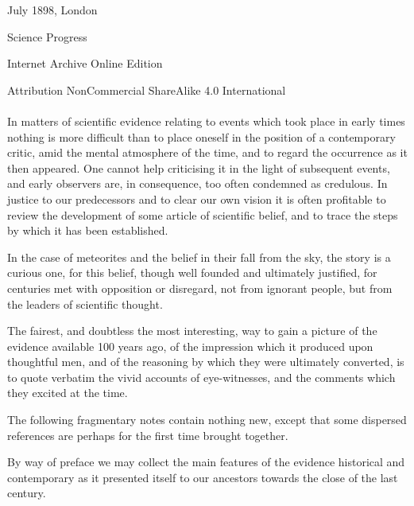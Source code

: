 \documentclass[a4paper, 12pt, oneside]{article}
\begin{document}
\begin{titlepage}
	\vspace*{\fill}%
	
	{\small July 1898, London}%
	
	{\small Science Progress} %

	\vspace{1\baselineskip} %

    Internet Archive Online Edition  %
	
	{\small Attribution NonCommercial ShareAlike 4.0 International } %
\end{titlepage}
\clearpage
\paragraph{}
In matters of scientific evidence relating to events which took place in early times nothing is more difficult than to place oneself in the position of a contemporary critic, amid the mental atmosphere of the time, and to regard the occurrence as it then appeared. One cannot help criticising it in the light of subsequent events, and early observers are, in consequence, too often condemned as credulous. In justice to our predecessors and to clear our own vision it is often profitable to review the development of some article of scientific belief, and to trace the steps by which it has been established. 

In the case of meteorites and the belief in their fall from the sky, the story is a curious one, for this belief, though well founded and ultimately justified, for centuries met with opposition or disregard, not from ignorant people, but from the leaders of scientific thought. 

The fairest, and doubtless the most interesting, way to gain a picture of the evidence available 100 years ago, of the impression which it produced upon thoughtful men, and of the reasoning by which they were ultimately converted, is to quote verbatim the vivid accounts of eye-witnesses, and the comments which they excited at the time. 

The following fragmentary notes contain nothing new, except that some dispersed references are perhaps for the first time brought together. 

By way of preface we may collect the main features of the evidence historical and contemporary as it presented itself to our ancestors towards the close of the last century. 
\end{document}
